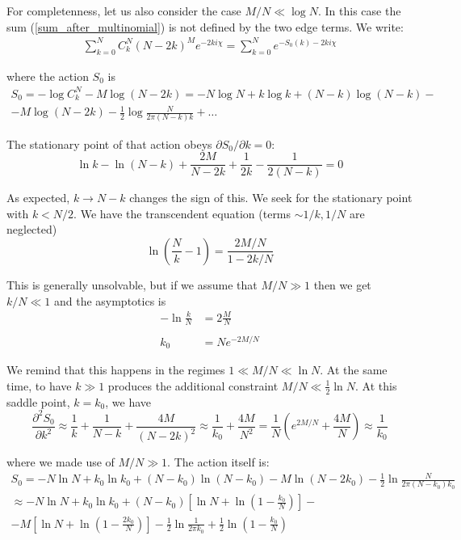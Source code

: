 For completenness, let us also consider the case $M/N\ll\log N$.
In this case the sum (\ref{sum_after_multinomial}) is not defined by the two edge terms.
We write:
\begin{gather}
\sum_{k=0}^{N}C_{k}^{N}(N-2k)^{M}e^{-2ki\chi}=\sum_{k=0}^{N}e^{-S_{0}(k)-2ki\chi}
\end{gather}

where the action $S_{0}$ is 
\begin{multline*}
S_{0}=-\log C_{k}^{N}-M\log(N-2k)=-N\log N+k\log k+(N-k)\log(N-k)-\\
-M\log(N-2k)-\frac{1}{2}\log\frac{N}{2\pi(N-k)k}+\dots
\end{multline*}

The stationary point of that action obeys $\partial S_{0}/\partial k=0$:
\[
\ln k-\ln(N-k)+\frac{2M}{N-2k}+\frac{1}{2k}-\frac{1}{2(N-k)}=0
\]

As expected, $k\to N-k$ changes the sign of this. We seek for the
stationary point with $k<N/2$. We have the transcendent equation
(terms $\sim1/k,1/N$ are neglected)
\[
\ln(\frac{N}{k}-1)=\frac{2M/N}{1-2k/N}
\]

This is generally unsolvable, but if we assume that $M/N\gg1$ then
we get $k/N\ll1$ and the asymptotics is
\begin{align*}
-\ln\frac{k}{N} & =2\frac{M}{N}\\
\\
k_{0} & =Ne^{-2M/N}
\end{align*}

We remind that this happens in the regimes $1\ll M/N\ll\ln N$. At
the same time, to have $k\gg1$ produces the additional constraint
$M/N\ll\frac{1}{2}\ln N$. At this saddle point, $k=k_{0}$, we have
\[
\frac{\partial^{2}S_{0}}{\partial k^{2}}\approx\frac{1}{k}+\frac{1}{N-k}+\frac{4M}{(N-2k)^{2}}\approx\frac{1}{k_{0}}+\frac{4M}{N^{2}}=\frac{1}{N}\left(e^{2M/N}+\frac{4M}{N}\right)\approx\frac{1}{k_{0}}
\]

where we made use of $M/N\gg1$. The action itself is:
\begin{multline*}
S_{0}=-N\ln N+k_{0}\ln k_{0}+(N-k_{0})\ln(N-k_{0})-M\ln(N-2k_{0})-\frac{1}{2}\ln\frac{N}{2\pi(N-k_{0})k_{0}}\\
\approx-N\ln N+k_{0}\ln k_{0}+(N-k_{0})\left[\ln N+\ln(1-\frac{k_{0}}{N})\right]-\\
-M\left[\ln N+\ln(1-\frac{2k_{0}}{N})\right]-\frac{1}{2}\ln\frac{1}{2\pi k_{0}}+\frac{1}{2}\ln(1-\frac{k_{0}}{N})
\end{multline*}



